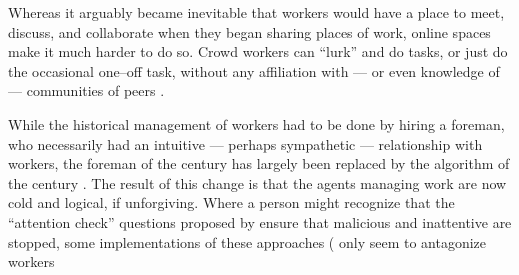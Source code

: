 \documentclass[trackingWork]{subfiles}
\begin{document}
\subsubsubsection{\whatchanged}
Whereas it arguably became inevitable that workers would have a place to
meet, discuss, and collaborate
when they began sharing places of work,
online spaces make it much harder to do so.
Crowd workers can ``lurk'' and do tasks, or just do the occasional one--off task,
without any affiliation with
--- or even knowledge of ---
communities of peers
\cite{miller2011understanding,mcinnis2016one,earl2011digitally}.

While the historical management of workers had to be done by hiring a foreman,
who necessarily had an intuitive
--- perhaps sympathetic ---
relationship with workers,
the foreman of the  century has largely been replaced
by the algorithm of the  century
\cite{uberAlgorithm}.
The result of this change is that the agents managing work are now
cold and logical, if unforgiving.
Where a person might recognize that the ``attention check'' questions 
proposed by \citeauthor{le2010ensuring} ensure that malicious and inattentive are stopped,
some implementations of these approaches
(\cite[see][]{MaliciousCrowdworkersGadiraju}
only seem to antagonize workers
\cite{le2010ensuring,MaliciousCrowdworkersGadiraju}



\subsubsubsection{\implication}







\end{document}
